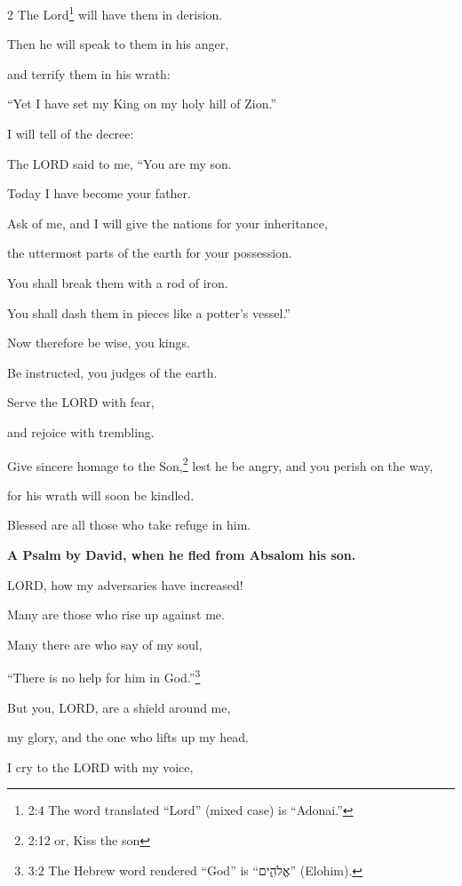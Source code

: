 \begin{multicols}{2}
	The Lord\footnote{2:4 The word translated “Lord” (mixed case) is “Adonai.”} will have them in derision.
	
	
	\myverse{}Then he will speak to them in his anger,
	
	and terrify them in his wrath:
	
	
	\myverse{}“Yet I have set my King on my holy hill of Zion.”
	
	
	\myverse{}I will tell of the decree:
	
	The LORD said to me, “You are my son.
	
	Today I have become your father.
	
	
	\myverse{}Ask of me, and I will give the nations for your inheritance,
	
	the uttermost parts of the earth for your possession.
	
	
	\myverse{}You shall break them with a rod of iron.
	
	You shall dash them in pieces like a potter’s vessel.”
	
	
	\myverse{}Now therefore be wise, you kings.
	
	Be instructed, you judges of the earth.
	
	
	\myverse{}Serve the LORD with fear,
	
	and rejoice with trembling.
	
	
	\myverse{}Give sincere homage to the Son,\footnote{2:12 or, Kiss the son} lest he be angry, and you perish on the way,
	
	for his wrath will soon be kindled.
	
	Blessed are all those who take refuge in him.
	
	
	\mychapter{}
	\textbf{A Psalm by David, when he fled from Absalom his son.}
	
	\myverse*{}LORD, how my adversaries have increased!
	
	Many are those who rise up against me.
	
	
	\myverse{}Many there are who say of my soul,
	
	“There is no help for him in God.”\footnote{3:2 The Hebrew word rendered “God” is “אֱלֹהִ֑ים” (Elohim).}
	
	\vspace{\baselineskip}
	
	
	\myverse{}But you, LORD, are a shield around me,
	
	my glory, and the one who lifts up my head.
	
	
	\myverse{}I cry to the LORD with my voice,
	

\end{multicols}
